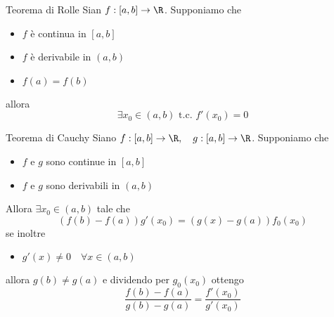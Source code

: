 \begin{teorema}{Teorema di Rolle}
	Sian $f: \left[ a,b \right]  \to \R$. Supponiamo che
	\begin{itemize}
		\item $f$ è continua in $\left[ a,b \right] $
		\item $f$ è derivabile in $ \left( a,b \right) $
		\item $f\left( a \right) = f\left( b \right) $
	\end{itemize}
	allora
	\[
		\exists x_0 \in  \left( a,b \right) \text{ t.c. } f'\left( x_0 \right) =0
	\]
\end{teorema}

\begin{teorema}{Teorema di Cauchy}
	Siano $f:\left[ a,b \right] \to \R, \quad  g:\left[ a,b \right] \to \R$. Supponiamo che
	\begin{itemize}
		\item $f$ e $g$ sono continue in $\left[ a,b \right] $
		\item $f$ e $g$ sono derivabili in $ \left( a,b \right) $
	\end{itemize}
	Allora $\exists x_0 \in  \left( a,b \right)$  tale che
	\[
		\left( f\left( b \right) - f\left( a \right)  \right) g'\left( x_0 \right) = \left( g\left( x \right) -g\left( a \right)  \right) f_0\left( x_0 \right)
	\]
	se inoltre
	\begin{itemize}
		\item  $g'\left( x \right) \neq 0 \quad \forall x \in \left( a,b \right) $
	\end{itemize}
	allora $g\left( b \right) \neq g\left( a \right) $ e dividendo per $g_0\left( x_0 \right) $ ottengo
	\[
		\frac{f\left( b \right) - f\left( a \right) }{g\left( b \right) -g\left( a \right) }= \frac{f'\left( x_0 \right)}{g'\left( x_0 \right) }
	\]
\end{teorema}

